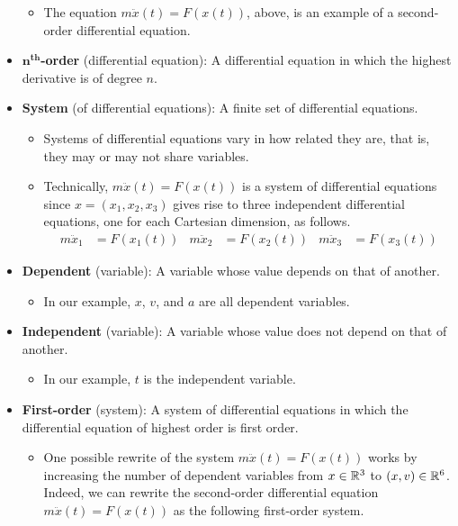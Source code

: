 \documentclass[../notes.tex]{subfiles}
\begin{document}
\begin{itemize}
    \begin{itemize}
        \item The equation $m\ddot{x}(t)=F(x(t))$, above, is an example of a second-order differential equation.
    \end{itemize}
    \item \textbf{$\bm{n}^\textbf{th}$-order} (differential equation): A differential equation in which the highest derivative is of degree $n$.
    \item \textbf{System} (of differential equations): A finite set of differential equations.
    \begin{itemize}
        \item Systems of differential equations vary in how related they are, that is, they may or may not share variables.
        \item Technically, $m\ddot{x}(t)=F(x(t))$ is a system of differential equations since $x=(x_1,x_2,x_3)$ gives rise to three independent differential equations, one for each Cartesian dimension, as follows.
        \begin{align*}
            m\ddot{x}_1 &= F(x_1(t))&
            m\ddot{x}_2 &= F(x_2(t))&
            m\ddot{x}_3 &= F(x_3(t))
        \end{align*}
    \end{itemize}
    \item \textbf{Dependent} (variable): A variable whose value depends on that of another.
    \begin{itemize}
        \item In our example, $x$, $v$, and $a$ are all dependent variables.
    \end{itemize}
    \item \textbf{Independent} (variable): A variable whose value does not depend on that of another.
    \begin{itemize}
        \item In our example, $t$ is the independent variable.
    \end{itemize}
    \item \textbf{First-order} (system): A system of differential equations in which the differential equation of highest order is first order.
    \begin{itemize}
        \item One possible rewrite of the system $m\ddot{x}(t)=F(x(t))$ works by increasing the number of dependent variables from $x\in\mathbb{R}^3$ to $(x,v)\in\mathbb{R}^6$. Indeed, we can rewrite the second-order differential equation $m\ddot{x}(t)=F(x(t))$ as the following first-order system.

\end{itemize}
\end{itemize}
\end{document}
